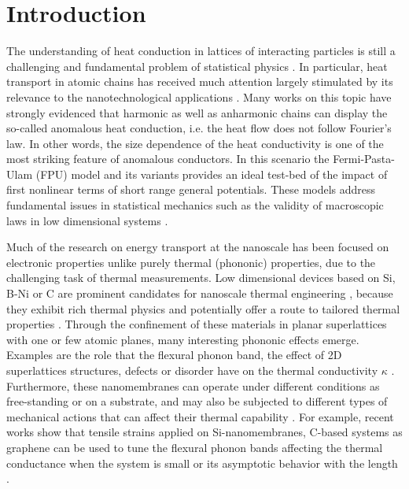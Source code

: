 \documentclass[12pt]{article}
\begin{document}
\section{Introduction}

The understanding of heat conduction in lattices of interacting particles is still a challenging and fundamental problem of statistical physics \cite{lepri,dhar}. In particular, heat transport in atomic chains has received much attention largely stimulated by its relevance to the nanotechnological applications \cite{nanoph}. Many works on this topic have strongly evidenced that harmonic as well as anharmonic chains can display the so-called anomalous heat conduction, i.e. the heat flow does not follow Fourier's law. In other words, the size dependence of the heat conductivity is one of the most striking feature of anomalous conductors. In this scenario the Fermi-Pasta-Ulam (FPU)\cite{FPU} model and its variants provides an ideal test-bed of the impact of first nonlinear terms of short range general potentials. These models address fundamental issues in statistical mechanics such as the validity of macroscopic laws in low dimensional systems \cite{das1,das2}.

Much of the research on energy transport at the nanoscale has been focused on electronic properties unlike purely thermal (phononic) properties, due to the challenging task of thermal measurements. Low dimensional devices based on Si, B-Ni or C are prominent candidates for nanoscale thermal engineering \cite{baladin,colombo,clivia}, because they exhibit rich thermal physics and potentially offer a route to tailored thermal properties \cite{baladin1,jain}.  Through the confinement of these materials in planar superlattices with one or few atomic planes, many interesting phononic effects emerge. Examples are the role that the flexural phonon band, the effect of 2D superlattices structures, defects or disorder have on the thermal conductivity $\kappa$ \cite{wagner,nika,gosh}. Furthermore, these nanomembranes can operate under different conditions as free-standing or on a substrate, and may also be subjected to different types of mechanical actions that can affect their thermal capability \cite{review}. For example, recent works show that tensile strains applied on Si-nanomembranes, C-based systems as graphene can be used to tune the flexural phonon bands affecting the thermal conductance when the system is small or its asymptotic behavior with the length  \cite{stsz,zhu, pereira, lindsay,xu,nuestroPIP}.
\end{document}
